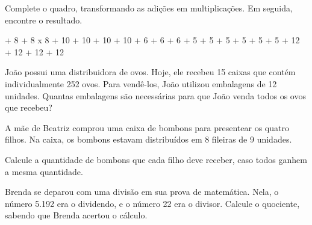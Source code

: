Complete o quadro, transformando as adições em multiplicações. Em
seguida, encontre o resultado.

\startplacetable[location=none]
\startxtable
\startxtablehead[head]
\startxrow
{} \stopxcell
{} \stopxcell
{} \stopxcell
\stopxrow
\stopxtablehead
\startxtablebody[body]
\startxrow
{} + 8 + 8 \stopxcell
{} x 8 \stopxcell
{} \stopxcell
\stopxrow
\startxrow
{} + 10 + 10 + 10 + 10 \stopxcell
\startxcell[align=right]  \stopxcell
\startxcell[align=right]  \stopxcell
\stopxrow
\startxrow
{} + 6 + 6 + 6 \stopxcell
\startxcell[align=right]  \stopxcell
\startxcell[align=right]  \stopxcell
\stopxrow
\startxrow
{} + 5 + 5 + 5 + 5 + 5 + 5 \stopxcell
\startxcell[align=right]  \stopxcell
\startxcell[align=right]  \stopxcell
\stopxrow
\stopxtablebody
\startxtablefoot[foot]
\startxrow
{} + 12 + 12 + 12 + 12 \stopxcell
\startxcell[align=right]  \stopxcell
\startxcell[align=right]  \stopxcell
\stopxrow
\stopxtablefoot
\stopxtable
\stopplacetable

\subsubsubsection[reference={section-8}]

João possui uma distribuidora de ovos. Hoje, ele recebeu 15 caixas que
contém individualmente 252 ovos. Para vendê-los, João utilizou
embalagens de 12 unidades. Quantas embalagens são necessárias para que
João venda todos os ovos que recebeu?

{}

\subsubsubsection[reference={section-9}]

A mãe de Beatriz comprou uma caixa de bombons para presentear os quatro
filhos. Na caixa, os bombons estavam distribuídos em 8 fileiras de 9
unidades.

{}

Calcule a quantidade de bombons que cada filho deve receber, caso todos
ganhem a mesma quantidade.

\subsubsubsection[reference={section-10}]

Brenda se deparou com uma divisão em sua prova de matemática. Nela, o
número 5.192 era o dividendo, e o número 22 era o divisor. Calcule o
quociente, sabendo que Brenda acertou o cálculo.

{}

